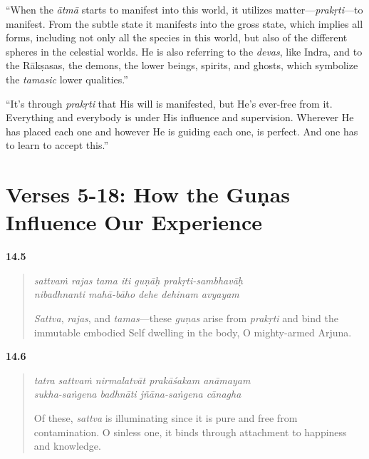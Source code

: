 \enquote{When the \textit{ātmā} starts to manifest into this world, it utilizes matter---\textit{prakṛti}---to manifest. From the subtle state it manifests into the gross state, which implies all forms, including not only all the species in this world, but also of the different spheres in the celestial worlds. He is also referring to the \textit{devas}, like Indra, and to the Rākṣasas, the demons, the lower beings, spirits, and ghosts, which symbolize the \textit{tamasic} lower qualities.}

\enquote{It’s through \textit{prakṛti} that His will is manifested, but He’s ever-free from it. Everything and everybody is under His influence and supervision. Wherever He has placed each one and however He is guiding each one, is perfect. And one has to learn to accept this.}

\section{Verses 5-18: How the Guṇas Influence Our Experience}\label{sec-verses-5-18-how-the-gunas-influence-our-experience}


\par\noindent\textbf{14.5}\par
\begin{verse}
\textit{sattvaṁ rajas tama iti guṇāḥ prakṛti-sambhavāḥ} \\
\textit{nibadhnanti mahā-bāho dehe dehinam avyayam}

\noindent \textit{Sattva}, \textit{rajas}, and \textit{tamas}---these \textit{guṇas} arise from \textit{prakṛti} and bind the immutable embodied Self dwelling in the body, O mighty-armed Arjuna.
\end{verse}
\par



\par\noindent\textbf{14.6}\par
\begin{verse}
\textit{tatra sattvaṁ nirmalatvāt prakāśakam anāmayam} \\
\textit{sukha-saṅgena badhnāti jñāna-saṅgena cānagha}

\noindent Of these, \textit{sattva} is illuminating since it is pure and free from contamination. O sinless one, it binds through attachment to happiness and knowledge.
\end{verse}
\par



